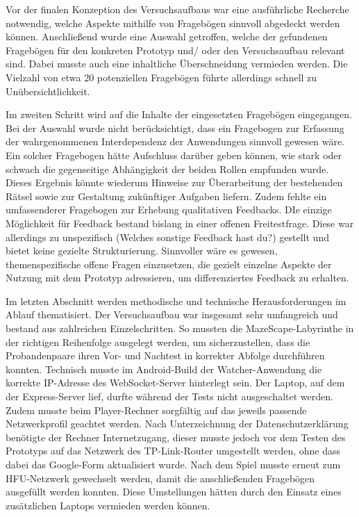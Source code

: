 Vor der finalen Konzeption des Versuchsaufbaus war eine ausführliche Recherche notwendig, welche Aspekte mithilfe von Fragebögen sinnvoll abgedeckt werden können. Anschließend wurde eine Auswahl getroffen, welche der gefundenen Fragebögen für den konkreten Prototyp und/ oder den Versuchsaufbau relevant sind. Dabei musste auch eine inhaltliche Überschneidung vermieden werden. Die Vielzahl von etwa 20 potenziellen Fragebögen führte allerdings schnell zu Unübersichtlichkeit.

Im zweiten Schritt wird auf die Inhalte der eingesetzten Fragebögen eingegangen.
Bei der Auswahl wurde nicht berücksichtigt, dass ein Fragebogen zur Erfassung der wahrgenommenen Interdependenz der Anwendungen sinnvoll gewesen wäre. Ein solcher Fragebogen hätte Aufschluss darüber geben können, wie stark oder schwach die gegenseitige Abhängigkeit der beiden Rollen empfunden wurde. Dieses Ergebnis könnte wiederum Hinweise zur Überarbeitung der bestehenden Rätsel sowie zur Gestaltung zukünftiger Aufgaben liefern.
Zudem fehlte ein umfassenderer Fragebogen zur Erhebung qualitativen Feedbacks. DIe einzige Möglichkeit für Feedback bestand bislang in einer offenen Freitestfrage. Diese war allerdings zu unspezifisch (Welches sonstige Feedback hast du?) gestellt und bietet keine gezielte Strukturierung. Sinnvoller wäre es gewesen, themenspezifische offene Fragen einzusetzen, die gezielt einzelne Aspekte der Nutzung mit dem Prototyp adressieren, um differenziertes Feedback zu erhalten.

Im letzten Abschnitt werden methodische und technische Herausforderungen im Ablauf thematisiert.
Der Versuchsaufbau war insgesamt sehr umfangreich und bestand aus zahlreichen Einzelschritten. So mussten die MazeScape-Labyrinthe in der richtigen Reihenfolge ausgelegt werden, um sicherzustellen, dass die Probandenpaare ihren Vor- und Nachtest in korrekter Abfolge durchführen konnten.
Technisch musste im Android-Build der Watcher-Anwendung die korrekte IP-Adresse des WebSocket-Server hinterlegt sein. Der Laptop, auf dem der Express-Server lief, durfte während der Tests nicht ausgeschaltet werden. Zudem musste beim Player-Rechner sorgfältig auf das jeweils passende Netzwerkprofil geachtet werden. Nach Unterzeichnung der Datenschutzerklärung benötigte der Rechner Internetzugang, dieser musste jedoch vor dem Testen des Prototyps auf das Netzwerk des TP-Link-Router umgestellt werden, ohne dass dabei das Google-Form aktualisiert wurde. Nach dem Spiel musste erneut zum HFU-Netzwerk gewechselt werden, damit die anschließenden Fragebögen ausgefüllt werden konnten. Diese Umstellungen hätten durch den Einsatz eines zusätzlichen Laptops vermieden werden können.

